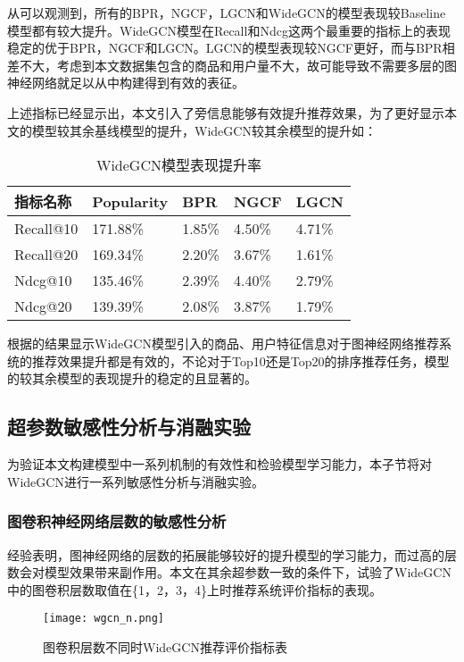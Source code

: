 \documentclass[lang=cn,11pt,a4paper,cite=authoryear]{elegantpaper}
\begin{document}
  从可以观测到，所有的BPR，NGCF，LGCN和WideGCN的模型表现较Baseline模型都有较大提升。WideGCN模型在Recall和Ndcg这两个最重要的指标上的表现稳定的优于BPR，NGCF和LGCN。LGCN的模型表现较NGCF更好，而与BPR相差不大，考虑到本文数据集包含的商品和用户量不大，故可能导致不需要多层的图神经网络就足以从中构建得到有效的表征。
  
  上述指标已经显示出，本文引入了旁信息能够有效提升推荐效果，为了更好显示本文的模型较其余基线模型的提升，WideGCN较其余模型的提升如：
  \begin{table}[!htb]
    \centering
    \caption{WideGCN模型表现提升率}
      \huge
      \begin{tabular}{C{2cm}|C{1.5cm}|C{1.5cm}|C{1.5cm}|C{1.5cm}}
      \hline
      \textbf{指标名称} & \textbf{Popularity} & \textbf{BPR} & \textbf{NGCF} & \textbf{LGCN} \\
      \hline
      Recall@10 & 171.88\% & 1.85\% & 4.50\% & 4.71\% \\
      Recall@20 & 169.34\% & 2.20\% & 3.67\% & 1.61\% \\
      Ndcg@10 & 135.46\% & 2.39\% & 4.40\% & 2.79\% \\
      Ndcg@20 & 139.39\% & 2.08\% & 3.87\% & 1.79\% \\
      \hline
      \end{tabular}
    \label{WGCN提升表}
  \end{table}

  根据的结果显示WideGCN模型引入的商品、用户特征信息对于图神经网络推荐系统的推荐效果提升都是有效的，不论对于Top10还是Top20的排序推荐任务，模型的较其余模型的表现提升的稳定的且显著的。

\subsection{超参数敏感性分析与消融实验}
为验证本文构建模型中一系列机制的有效性和检验模型学习能力，本子节将对WideGCN进行一系列敏感性分析与消融实验。
\subsubsection{图卷积神经网络层数的敏感性分析}
经验表明，图神经网络的层数的拓展能够较好的提升模型的学习能力，而过高的层数会对模型效果带来副作用。本文在其余超参数一致的条件下，试验了WideGCN中的图卷积层数取值在\{1，2，3，4\}上时推荐系统评价指标的表现。
\begin{figure}[H]
  \centering
  \texttt{[image: wgcn\_n.png]}
  \caption{图卷积层数不同时WideGCN推荐评价指标表}
  \label{wgcnn图}
\end{figure}
\end{document}
